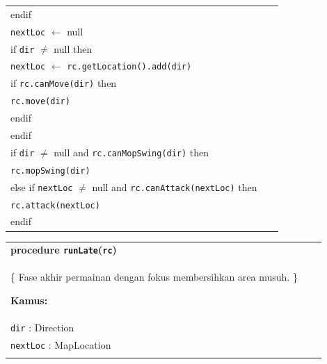 \documentclass{article}
\newenvironment{pseudobox}
{
\centering
\begin{longtable}{|p{0.94\linewidth}|}
\hline
}
{
\\ \hline
\end{longtable}
\vspace{0.05cm}
}
\begin{document}
\begin{enumerate}[label=\alph*.]
\begin{pseudobox}
\hspace*{1.5em}endif \\

\hspace*{1.5em}\texttt{nextLoc} $\leftarrow$ null \\

\hspace*{1.5em}if \texttt{dir} $\neq$ null then \\

\hspace*{3em}\texttt{nextLoc} $\leftarrow$ \texttt{rc.getLocation().add(dir)} \\

\hspace*{3em}if \texttt{rc.canMove(dir)} then \\
\hspace*{4.5em}\texttt{rc.move(dir)} \\
\hspace*{3em}endif \\

\hspace*{1.5em}endif \\

\hspace*{1.5em}if \texttt{dir} $\neq$ null and \texttt{rc.canMopSwing(dir)} then \\
\hspace*{3em}\texttt{rc.mopSwing(dir)} \\

\hspace*{1.5em}else if \texttt{nextLoc} $\neq$ null and \texttt{rc.canAttack(nextLoc)} then \\
\hspace*{3em}\texttt{rc.attack(nextLoc)} \\
\hspace*{1.5em}endif
\end{pseudobox}

\begin{pseudobox}
\textbf{procedure \texttt{runLate}(\texttt{rc})} \\
\{ Fase akhir permainan dengan fokus membersihkan area musuh. \}

\textbf{Kamus:} \\
\hspace*{1.5em}\texttt{dir} : Direction \\
\hspace*{1.5em}\texttt{nextLoc} : MapLocation \\


\end{pseudobox}
\end{enumerate}
\end{document}
